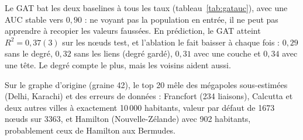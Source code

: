 \begin{table}[!ht]
\centering
\footnotesize
\caption{Populations injectées, nœuds test, moyenne sur 5 graines (écart-type sur le dernier chiffre entre parenthèses). Une AP aléatoire vaut environ $r$.}
\label{tab:gatauc}
\setlength{\tabcolsep}{3.5pt}
\end{table}

Le GAT bat les deux baselines à tous les taux (tableau~\ref{tab:gatauc}), avec une AUC stable vers $0{,}90$ : ne voyant pas la population en entrée, il ne peut pas apprendre à recopier les valeurs faussées. En prédiction, le GAT atteint $R^2=0{,}37(3)$ sur les nœuds test, et l'ablation le fait baisser à chaque fois : $0{,}29$ sans le degré, $0{,}32$ sans les liens (degré gardé), $0{,}31$ avec une couche et $0{,}34$ avec une tête. Le degré compte le plus, mais les voisins aident aussi.

Sur le graphe d'origine (graine 42), le top 20 mêle des mégapoles sous-estimées (Delhi, Karachi) et des erreurs de données : Francfort (234 liaisons), Calcutta et deux autres villes à exactement 10\,000 habitants, valeur par défaut de 1673 nœuds sur 3363, et Hamilton (Nouvelle-Zélande) avec 902 habitants, probablement ceux de Hamilton aux Bermudes.


